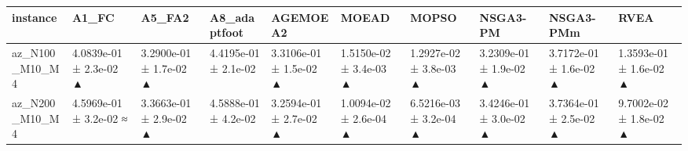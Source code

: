 \begin{tabular}{llllllllll}
\toprule
instance & A1\_FC & A5\_FA2 & A8\_adaptfoot & AGEMOEA2 & MOEAD & MOPSO & NSGA3-PM & NSGA3-PMm & RVEA \\
\midrule
az\_N100\_M10\_M4 & 4.0839e-01 ± 2.3e-02 ▲ & 3.2900e-01 ± 1.7e-02 ▲ & 4.4195e-01 ± 2.1e-02 & 3.3106e-01 ± 1.5e-02 ▲ & 1.5150e-02 ± 3.4e-03 ▲ & 1.2927e-02 ± 3.8e-03 ▲ & 3.2309e-01 ± 1.9e-02 ▲ & 3.7172e-01 ± 1.6e-02 ▲ & 1.3593e-01 ± 1.6e-02 ▲ \\
az\_N200\_M10\_M4 & 4.5969e-01 ± 3.2e-02 ≈ & 3.3663e-01 ± 2.9e-02 ▲ & 4.5888e-01 ± 4.2e-02 & 3.2594e-01 ± 2.7e-02 ▲ & 1.0094e-02 ± 2.6e-04 ▲ & 6.5216e-03 ± 3.2e-04 ▲ & 3.4246e-01 ± 3.0e-02 ▲ & 3.7364e-01 ± 2.5e-02 ▲ & 9.7002e-02 ± 1.8e-02 ▲ \\
\bottomrule
\end{tabular}
